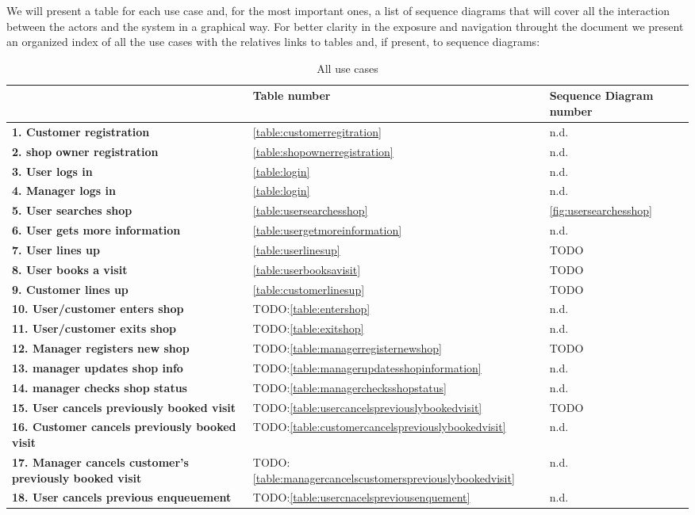 We will present a table for each use case and, for the most important ones, a list of sequence diagrams that will cover all the interaction between the actors and the system in a graphical way. For better clarity in the exposure and navigation throught the document we present an organized index of all the use cases with the relatives links to tables and, if present, to sequence diagrams:
\begin{table}[h!]
    \centering
    \begin{tabular}{@{}P{0.60\textwidth}P{0.15\textwidth}P{0.20\textwidth}@{}}
        & \textbf{Table number} & \textbf{Sequence Diagram number}\\
        \toprule
        \textbf{1. Customer registration} & \ref{table:customerregitration} & n.d.\\
        \textbf{2. shop owner registration} & \ref{table:shopownerregistration} & n.d.\\
        \textbf{3. User logs in} & \ref{table:login} & n.d.\\
        \textbf{4. Manager logs in} & \ref{table:login} & n.d.\\
        \textbf{5. User searches shop}& \ref{table:usersearchesshop} & \ref{fig:usersearchesshop}\\
        \textbf{6. User gets more information} & \ref{table:usergetmoreinformation}& n.d.\\
        \textbf{7. User lines up} & \ref{table:userlinesup} & TODO\\
        \textbf{8. User books a visit} & \ref{table:userbooksavisit} & TODO \\
        \textbf{9. Customer lines up} & \ref{table:customerlinesup}& TODO\\
        \textbf{10. User/customer enters shop} & TODO:\ref{table:entershop} & n.d.\\
        \textbf{11. User/customer exits shop} & TODO:\ref{table:exitshop} & n.d.\\
        \textbf{12. Manager registers new shop} & TODO:\ref{table:managerregisternewshop} & TODO\\
        \textbf{13. manager updates shop info} & TODO:\ref{table:managerupdatesshopinformation} & n.d.\\
        \textbf{14. manager checks shop status} & TODO:\ref{table:managerchecksshopstatus} & n.d.\\
        \textbf{15. User cancels previously booked visit} & TODO:\ref{table:usercancelspreviouslybookedvisit} & TODO \\
        \textbf{16. Customer cancels previously booked visit} & TODO:\ref{table:customercancelspreviouslybookedvisit} & n.d. \\
        \textbf{17. Manager cancels customer's previously booked visit} & TODO:\ref{table:managercancelscustomerspreviouslybookedvisit} & n.d. \\
        \textbf{18. User cancels previous enqueuement} & TODO:\ref{table:usercnacelspreviousenquement} & n.d. \\
        \bottomrule
    \end{tabular}
\caption{All use cases}
\label{table:usecase1}
\end{table}

